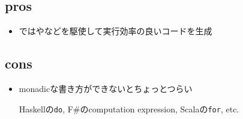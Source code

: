 \subsection*{pros}
\begin{frame}
  \frametitlesubs

  \begin{itemize}
    \item[\coloremoji{😁}] 

      \cite{pretnar2017efficient}ではやなどを駆使して実行効率の良いコードを生成
  \end{itemize}
\end{frame}

\subsection*{cons}
\begin{frame}[fragile]
  \frametitlesubs

  \begin{itemize}
    \item[\coloremoji{😅}] 

      monadicな書き方ができないとちょっとつらい

      {\small Haskellの\lstinline{do}, F\#のcomputation expression,  Scalaの\lstinline{for}, etc.}
  \end{itemize}
\end{frame}
